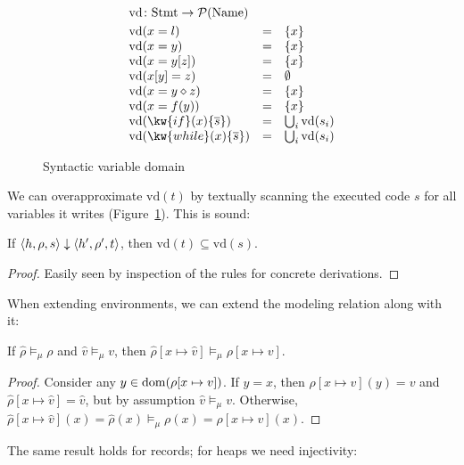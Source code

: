\documentclass{article}
\begin{document}
\begin{figure}
\[
\begin{array}{lcl}
\multicolumn{2}{l}{\mathrm{vd} \colon \Stmt \to \mathcal{P}(\Name)}\\[1mm]
\mathrm{vd}(x=l) & = & \{x\} \\
\mathrm{vd}(x=y) & = & \{x\} \\
\mathrm{vd}(x=y[z]) & = & \{x\} \\
\mathrm{vd}(x[y]=z) & = & \emptyset \\
\mathrm{vd}(x=y\diamond z) & = & \{x\} \\
\mathrm{vd}(x=f(y)) & = & \{x\} \\
\mathrm{vd}(\kw{if}(x)\{\overline{s}\}) & = & \bigcup_i\mathrm{vd}(s_i) \\
\mathrm{vd}(\kw{while}(x)\{\overline{s}\}) & = & \bigcup_i\mathrm{vd}(s_i) \\
\end{array}
\]
\caption{Syntactic variable domain}\label{fig:syntactic-vd}
\end{figure}

We can overapproximate $\mathrm{vd}(t)$ by textually scanning the executed code $s$ for all variables it writes (Figure~\ref{fig:syntactic-vd}). This is sound:

\begin{lemma}\label{lem:syntactic-vd}
If $\langle h,\rho,s\rangle\downarrow\langle h',\rho',t\rangle$, then $\mathrm{vd}(t)\subseteq\mathrm{vd}(s)$.
\end{lemma}
\begin{proof}
Easily seen by inspection of the rules for concrete derivations.
\end{proof}

When extending environments, we can extend the modeling relation along with it:

\begin{lemma}\label{lem:envext}
If $\hat{\rho}\models_{\mu}\rho$ and $\hat{v}\models_{\mu} v$, then $\hat{\rho}[x\mapsto\hat{v}]\models_{\mu}\rho[x\mapsto v]$.
\end{lemma}
\begin{proof}
Consider any $y\in\operatorname{dom}(\rho[x\mapsto v])$. If $y=x$, then $\rho[x\mapsto v](y)=v$ and $\hat{\rho}[x\mapsto\hat{v}]=\hat{v}$, but by assumption $\hat{v}\models_{\mu}v$. Otherwise, $\hat{\rho}[x\mapsto\hat{v}](x)=\hat{\rho}(x)\models_{\mu}\rho(x)=\rho[x\mapsto v](x)$.
\end{proof}

The same result holds for records; for heaps we need injectivity:
\end{document}

